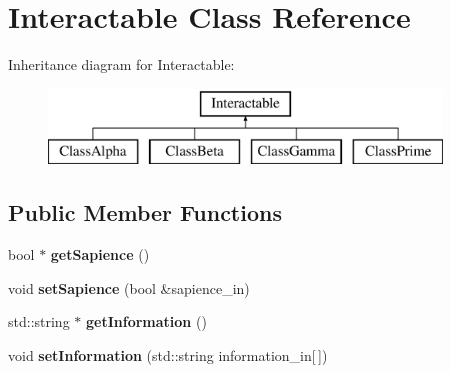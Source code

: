 \hypertarget{class_interactable}{}\section{Interactable Class Reference}
\label{class_interactable}
Inheritance diagram for Interactable\+:\begin{figure}[H]
\begin{center}
\leavevmode
\includegraphics[height=2.000000cm]{class_interactable}
\end{center}
\end{figure}
\subsection*{Public Member Functions}
\begin{DoxyCompactItemize}
\item 
\mbox{\label{class_interactable_a666909005d7b621011daeee3bd0192e1}} 
bool $\ast$ {\bfseries get\+Sapience} ()
\item 
\mbox{\label{class_interactable_ab41fd7c62989d19e3059c19a9e28b931}} 
void {\bfseries set\+Sapience} (bool \&sapience\+\_\+in)
\item 
\mbox{\label{class_interactable_af73feb8ca0600616e901f2c90283f1fb}} 
std\+::string $\ast$ {\bfseries get\+Information} ()
\item 
\mbox{\label{class_interactable_a24608c22a5088d637e2fb3e54b3b96d1}} 
void {\bfseries set\+Information} (std\+::string information\+\_\+in\mbox{[}$\,$\mbox{]})
\end{DoxyCompactItemize}

